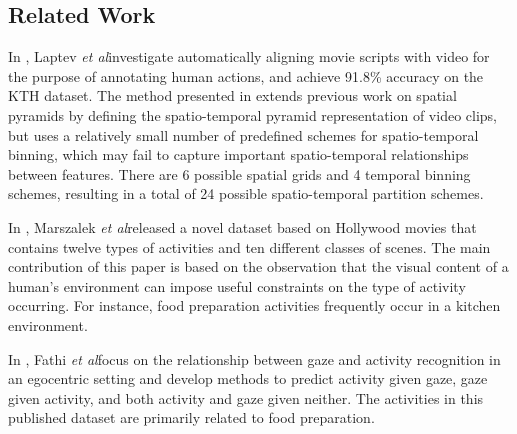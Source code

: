 \documentclass{bmvc2k}
\def\etal{\emph{et al}\bmvaOneDot}
\begin{document}
\subsection{Related Work}


	In \cite{Laptev08}, Laptev \etal investigate automatically aligning movie scripts with
	video for the purpose of annotating human actions, and achieve 91.8\%
  accuracy on the KTH dataset. The method presented in \cite{Laptev08} 
  extends previous work on spatial pyramids \cite{Bosch07, Lazebnik06}
  by defining the spatio-temporal pyramid representation of video clips, but uses a
  relatively small number of predefined schemes for spatio-temporal binning,
  which may fail to capture important spatio-temporal relationships between
  features. There are 6 possible spatial grids and 4 temporal binning
  schemes, resulting in a total of 24 possible spatio-temporal partition
  schemes. 
	
	In \cite{Marszalek09}, Marszalek \etal released a novel dataset based on
	Hollywood movies that contains twelve types of activities and ten
	different classes of scenes. The main contribution of this paper is based
	on the observation that the visual content of a human's environment can
	impose useful constraints on the type of activity occurring. For instance,
	food preparation activities frequently occur in a kitchen environment. 
	
	In \cite{Fathi12}, Fathi \etal focus on the relationship between gaze and
	activity recognition in an egocentric setting and develop methods to
	predict activity given gaze, gaze given activity, and both
	activity and gaze given neither. The activities in this
	published dataset are primarily related to food preparation. 
	
\end{document}
